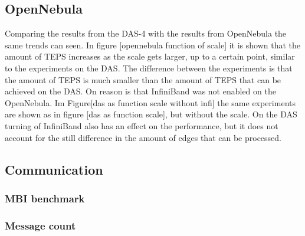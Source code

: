 \subsection{OpenNebula}

Comparing the results from the DAS-4 with the results from OpenNebula the same trends can seen. In figure [opennebula function of scale] it is shown that the amount of TEPS increases as the scale gets larger, up to a certain point, similar to the experiments on the DAS. The difference between the experiments is that the amount of TEPS is much smaller than the amount of TEPS that can be achieved on the DAS. On reason is that InfiniBand was not enabled on the OpenNebula. Im Figure[das as function scale without infi] the same experiments are shown as in  figure [das as function scale], but without the scale. On the DAS turning of  InfiniBand also has an effect on the performance, but it does not account for the still difference in the amount of edges that can be processed.


\subsection{Communication}

\subsubsection{MBI benchmark}
\subsubsection{Message count}
